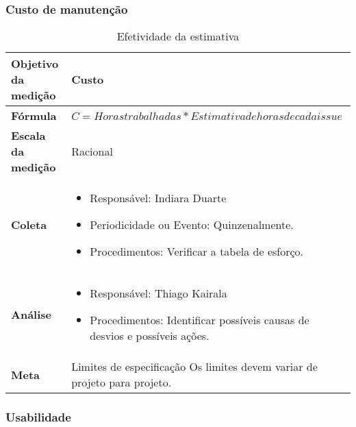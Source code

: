 \subsubsection{Custo de manutenção}


\begin{table}[H]
\centering
\begin{tabular}{|p{4cm}|p{7cm}|}
\hline
	\textbf{Objetivo da medição} &
	Custo
	\\ \hline
	\textbf{Fórmula} &
	$C = Horas trabalhadas * Estimativa de horas de cada issue$
	\\ \hline
	\textbf{Escala da medição} &
	Racional
	\\ \hline
	\textbf{Coleta} &
	\begin{itemize}
		\item{Responsável: Indiara Duarte}
		\item{Periodicidade ou Evento: Quinzenalmente.}
		\item{Procedimentos: Verificar a tabela de esforço.}
	\end{itemize}
	\\ \hline
	\textbf{Análise} &
	\begin{itemize}
		\item Responsável: Thiago Kairala
		\item Procedimentos: Identificar possíveis causas de desvios e possíveis ações.
	\end{itemize}
	\\ \hline
	\textbf{Meta} &
	Limites de especificação
		Os limites devem variar de projeto para projeto.
  \\ \hline
\end{tabular}
\caption{Efetividade da estimativa}
\label{tab:efetividade_estimativa}
\end{table}

\subsubsection{Usabilidade}

